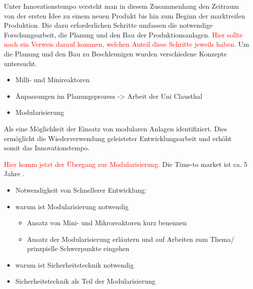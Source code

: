 Unter Innovationstempo versteht man in diesem Zusammenhang den Zeitraum von der ersten Idee zu einem neuen Produkt bis hin zum Beginn der marktreifen Produktion. Die dazu erforderlichen Schritte umfassen die notwendige Forschungsarbeit, die Planung und den Bau der Produktionsanlagen. \textcolor{red}{Hier sollte noch ein Verweis darauf kommen, welchen Anteil diese Schritte jeweils haben.} \hfill \newline
Um die Planung und den Bau zu Beschleunigen wurden verschiedene Konzepte untersucht. 
\begin{itemize}
\item Milli- und Minireaktoren
\item \"Anpassungen im Planungsprozess -> Arbeit der Uni Clausthal
\item Modularisierung
\end{itemize}
Als eine M\"oglichkeit der Einsatz von modularen Anlagen identifiziert. Dies erm\"oglicht die Wiederverwendung geleisteter Entwicklungsarbeit und erh\"oht somit das Innovationstempo.    

\textcolor{red}{Hier komm jetzt der \"Ubergang zur Modularisierung.} Die Time-to market ist ca. 5 Jahre \cite{Schembecker_2009}. 

\begin{itemize}
\item Notwendigkeit von Schnellerer Entwicklung: \cite{Grossmann_2000}
\end{itemize}

\begin{itemize}
\item warum ist Modularisierung notwendig
  \begin{itemize}
  \item Ansatz von Mini- und Mikroreaktoren kurz benennen
  \item Ansatz der Modularisierung erl\"autern und auf Arbeiten zum Thema/ prinzpielle Schwerpunkte eingehen
  
  \end{itemize}
\item warum ist Sicherheitstechnik notwendig
\item Sicherheitstechnik als Teil der Modularisierung 
\end{itemize}